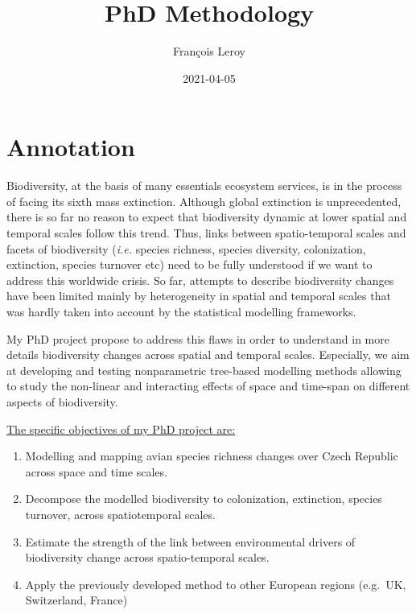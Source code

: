 \documentclass[
  12pt,
  oneside]{report}
\title{PhD Methodology}
\author{François Leroy}
\date{2021-04-05}
\providecommand{\tightlist}{%
  \setlength{\itemsep}{0pt}\setlength{\parskip}{0pt}}
\begin{document}
\maketitle


\cleardoublepage 
{}

{
\hypersetup{linkcolor=}
\setcounter{tocdepth}{1}
\tableofcontents
}
\listoffigures
\listoftables
{}


\cleardoublepage 
{}


\hypertarget{annotation}{%
\chapter*{Annotation}\label{annotation}}

Biodiversity, at the basis of many essentials ecosystem services, is in the process of facing its sixth mass extinction. Although global extinction is unprecedented, there is so far no reason to expect that biodiversity dynamic at lower spatial and temporal scales follow this trend. Thus, links between
spatio-temporal scales and facets of biodiversity (\emph{i.e.} species richness, species diversity, colonization, extinction,
species turnover etc) need to be fully understood if we want to address this worldwide crisis. So far,
attempts to describe biodiversity changes have been limited mainly by heterogeneity in spatial and
temporal scales that was hardly taken into account by the statistical modelling frameworks.

My PhD project propose to address this flaws in order to understand in more details biodiversity
changes across spatial and temporal scales. Especially, we aim at developing and testing nonparametric
tree-based modelling methods allowing to study the non-linear and interacting effects of
space and time-span on different aspects of biodiversity.

\underline{The specific objectives of my PhD project are:}

\begin{enumerate}
\def\labelenumi{\arabic{enumi}.}
\tightlist
\item
  Modelling and mapping avian species richness changes over Czech Republic across space and time
  scales.
\item
  Decompose the modelled biodiversity to colonization, extinction, species turnover, across spatiotemporal
  scales.
\item
  Estimate the strength of the link between environmental drivers of biodiversity change across
  spatio-temporal scales.
\item
  Apply the previously developed method to other European regions (e.g.~UK, Switzerland, France)
\end{enumerate}
\end{document}
